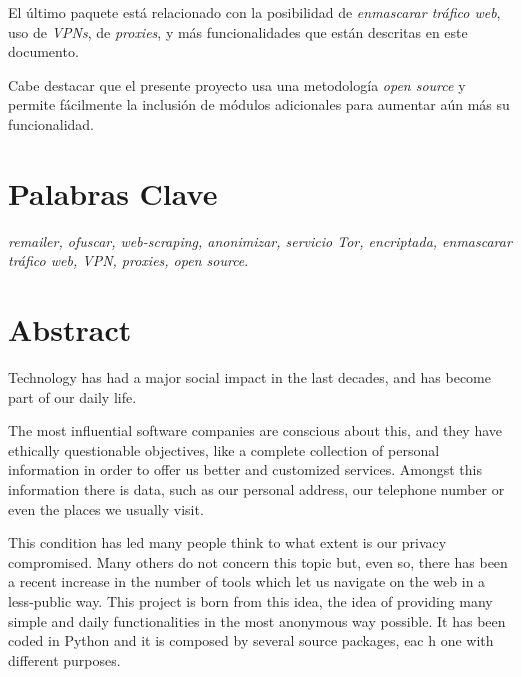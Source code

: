 El último paquete está relacionado con la posibilidad de
\textit{enmascarar tráfico web}, uso de \textit{VPNs}, de
\textit{proxies}, y más funcionalidades que están descritas en este
documento.

Cabe destacar que el presente proyecto usa una metodología
\textit{open source} y permite fácilmente la inclusión de módulos
adicionales para aumentar aún más su funcionalidad.

\section*{Palabras Clave}
\textit{remailer, ofuscar, web-scraping, anonimizar, servicio Tor, encriptada, enmascarar tráfico web, VPN, proxies, open source}.
\newpage

\section*{Abstract}
Technology has had a major social impact in the last decades, and has become part of our daily life.

The most influential software companies are conscious about this, and
they have ethically questionable objectives, like a complete
collection of personal information in order to offer us better and
customized services. Amongst this information there is
 data, such as our personal address, our telephone
number or even the places we usually visit. 

This condition has led many people think to what extent is our privacy
compromised. Many others do not concern this topic but, even so, there
has been a recent increase in the number of tools which let us
navigate on the web in a less-public way. This project is born from
this idea, the idea of providing many simple and daily functionalities
in the most anonymous way possible. It has been coded in Python and it
is composed by several source packages, eac h one with different
purposes.

